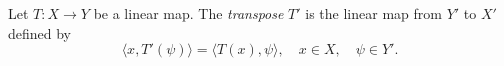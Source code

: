 Let $T: X \to Y$ be a linear map. The \emph{transpose} $T'$ is the linear map from $Y'$ to $X'$ defined by $$\langle x, T'(\psi) \rangle = \langle T(x), \psi \rangle, \quad x \in X, \quad \psi \in Y'.$$
